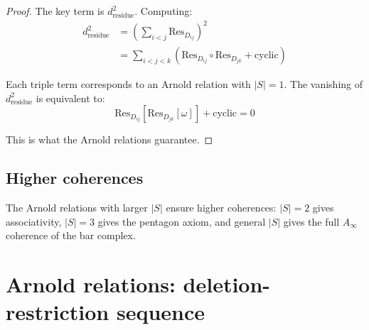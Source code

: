\begin{proof}
The key term is $d_{\text{residue}}^2$. Computing:
\begin{align}
d_{\text{residue}}^2 &= \left(\sum_{i<j} \text{Res}_{D_{ij}}\right)^2 \\
&= \sum_{i<j<k} \left(\text{Res}_{D_{ij}} \circ \text{Res}_{D_{jk}} + \text{cyclic}\right)
\end{align}

Each triple term corresponds to an Arnold relation with $|S| = 1$. The vanishing of $d_{\text{residue}}^2$ is equivalent to:
\[\text{Res}_{D_{ij}}[\text{Res}_{D_{jk}}[\omega]] + \text{cyclic} = 0\]

This is what the Arnold relations guarantee.
\end{proof}

\subsection{Higher coherences}

\begin{remark}
The Arnold relations with larger $|S|$ ensure higher coherences: $|S| = 2$ gives associativity, $|S| = 3$ gives the pentagon axiom, and general $|S|$ gives the full $A_\infty$ coherence of the bar complex.
\end{remark}

\section{Arnold relations: deletion-restriction sequence}
\label{sec:arnold-nine-term}

